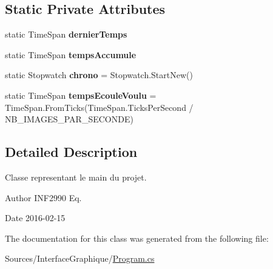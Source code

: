 \subsection*{Static Private Attributes}
\begin{DoxyCompactItemize}
\item 
static Time\+Span {\bfseries dernier\+Temps}
\item 
static Time\+Span {\bfseries temps\+Accumule}
\item 
static Stopwatch {\bfseries chrono} = Stopwatch.\+Start\+New()
\item 
static Time\+Span {\bfseries temps\+Ecoule\+Voulu} = Time\+Span.\+From\+Ticks(Time\+Span.\+Ticks\+Per\+Second / N\+B\+\_\+\+I\+M\+A\+G\+E\+S\+\_\+\+P\+A\+R\+\_\+\+S\+E\+C\+O\+N\+DE)
\end{DoxyCompactItemize}


\subsection{Detailed Description}
Classe representant le main du projet. 

\begin{DoxyAuthor}{Author}
I\+N\+F2990 Eq. 
\end{DoxyAuthor}
\begin{DoxyDate}{Date}
2016-\/02-\/15 
\end{DoxyDate}


The documentation for this class was generated from the following file\+:\begin{DoxyCompactItemize}
\item 
Sources/\+Interface\+Graphique/\hyperlink{_program_8cs}{Program.\+cs}\end{DoxyCompactItemize}
